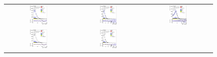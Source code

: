 \begin{figure}[tp]
  \centering
  \begin{tabular}{ccc}
  \includegraphics[width=0.27\textwidth]{Analysis/Figures_ttH/tesis_vars/prefit/lep_pt_6jetin2btagex.eps} &
  \includegraphics[width=0.27\textwidth]{Analysis/Figures_ttH/tesis_vars/prefit/met_6jetin2btagex.eps} &
  \includegraphics[width=0.27\textwidth]{Analysis/Figures_ttH/tesis_vars/prefit/WlepMT_6jetin2btagex.eps} \\
  \includegraphics[width=0.27\textwidth]{Analysis/Figures_ttH/tesis_vars/postfit/lep_pt_6jetin2btagex.eps} &
  \includegraphics[width=0.27\textwidth]{Analysis/Figures_ttH/tesis_vars/postfit/met_6jetin2btagex.eps} &

\end{tabular}
\end{figure}
